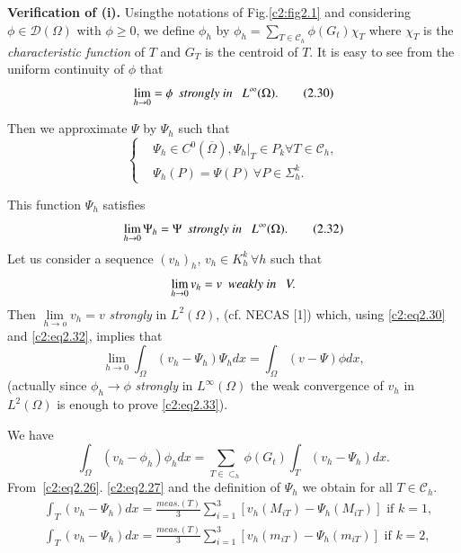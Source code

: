 \medskip
\noindent\textbf{Verification of (i).}%
 Using\pageoriginale  the notations of Fig.\ref{c2:fig2.1} and considering $\phi \in
 \mathscr{D}(\Omega)$ with $\phi \geq 0$, we define $\phi _h $ by
 $\phi_h = \sum\limits_{T \in \mathscr{C}_h } \phi (G_t ) \chi_T$
 where $\chi_T$ is the \textit{characteristic function} of $T$  and
 $G_T$ is the centroid of $T$. It is easy to see from the uniform
 continuity of $\phi$ that  
 \begin{equation}
\lim\limits_{h \to 0} = \phi~~ \text{\em strongly in }~~L^\infty
(\Omega).\tag{2.30}\label{c2:eq2.30}   
\end{equation}

Then we approximate $\Psi $ by $\Psi _h $ such that  
\begin{equation*}
\left\{\begin{aligned}
&\Psi_h \in C^0 (\overline{\Omega}), \Psi_h | _{T} \in P_k
\forall T \in \mathscr{C}_h,\\ 
&\Psi_h (P) = \Psi (P)\, \forall  P \in \Sigma^k_h. 
\end{aligned}\right.\tag{2.31}\label{c2:eq2.31}  
\end{equation*}

This function $\Psi_h$ satisfies
\begin{equation}
\lim\limits_{h \to 0} \Psi_h = \Psi ~~\text{\em strongly  in
}~~L^\infty (\Omega).\tag{2.32}\label{c2:eq2.32} 
\end{equation}
Let us consider a sequence $(v_h)_h$, $v_h \in K^k_h \, \forall  h$
such that  
$$
\lim\limits_{h \to 0} v_h = v~~ \text{\em weakly  in }~~V.
$$
Then $\lim\limits_{h \to o} v_h = v$ \textit{ strongly } in
$L^2(\Omega)$, (cf. NECAS [1]) which, using \eqref{c2:eq2.30} and
\eqref{c2:eq2.32}, implies that 
\begin{equation}
\lim\limits_{h \to 0} \int_\Omega (v_h - \Psi _h ) \Psi _h dx = \int
_\Omega (v - \Psi) \phi dx, \tag{2.33}\label{c2:eq2.33} 
\end{equation}
(actually since $\phi_h \to \phi$ \textit{strongly} in $L^\infty
(\Omega)$ the weak convergence of $v_h$ in $L^2(\Omega)$ is enough to
prove \eqref{c2:eq2.33}). 

We have 
\begin{equation}
\int_\Omega (v_h - \phi_h) \phi_h dx = \sum\limits_{T \in \subset
  _h} \phi (G_t) \int_T (v_h - \Psi_h) dx.\tag{2.34}\label{c2:eq2.34}  
\end{equation} 
From~\eqref{c2:eq2.26}. \eqref{c2:eq2.27} and the definition of
$\Psi_h$ we obtain for all $T \in  \mathscr{C}_h$. 
\begin{align}
&\int_T (v_h - \Psi_h ) dx = \frac{meas. (T)}{3} \sum\limits_{i=1}^{3}
[v_h (M_{iT}) - \Psi _h (M_{iT})] \text{ if } k=1,
\tag{2.35}\label{c2:eq2.35}\\  
&\int_T (v_h - \Psi_h ) dx = \frac{meas. (T)}{3} \sum\limits_{i=1}^{3}
[v_h (m_{iT}) - \Psi _h (m_{iT})] \text{ if } k=2,
\tag{2.36}\label{c2:eq2.36}  
\end{align}\pageoriginale  
 
